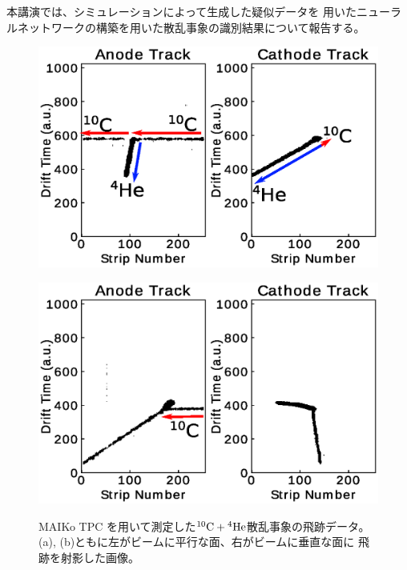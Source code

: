 \documentclass[12pt,a4paper]{jsarticle}
\begin{document}
本講演では、シミュレーションによって生成した疑似データを
用いたニューラルネットワークの構築を用いた散乱事象の識別結果について報告する。

\begin{figure}[h]
  \begin{minipage}{0.5\hsize}
    \begin{center}
      \includegraphics[clip,width=0.8\columnwidth]{true.eps}
    \end{center}
    \vspace*{-1\intextsep}
    \label{fig:true}
  \end{minipage}
  \begin{minipage}{0.5\hsize}
    \begin{center}
      \includegraphics[clip,width=0.8\columnwidth]{false.eps}
    \end{center}
    \vspace*{-1\intextsep}
    \label{fig:false}
  \end{minipage}
  \vspace*{-0.7\intextsep}
  \caption{\small
    MAIKo TPC を用いて測定した${}^{10}\rm{C} + {}^{4}\rm{He}$散乱事象の飛跡データ。
    (a), (b)ともに左がビームに平行な面、右がビームに垂直な面に
    飛跡を射影した画像。
  }
\end{figure}
\end{document}
